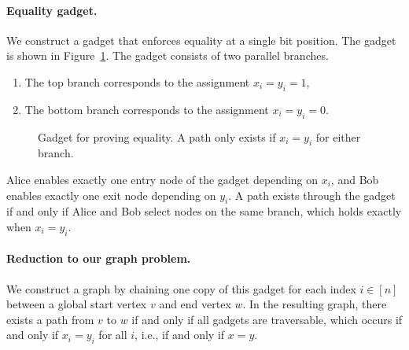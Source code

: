 \paragraph{Equality gadget.}
We construct a gadget that enforces equality at a single bit position. The gadget is shown in Figure~\ref{fig:equality_gadget}. The gadget consists of two parallel branches.

\begin{enumerate}
    \item The top branch corresponds to the assignment $x_i = y_i = 1$, 
    \item The bottom branch corresponds to the assignment $x_i = y_i = 0$. 
\end{enumerate}
 

\begin{figure}[h]
\centering
{}
\caption{Gadget for proving equality. A path only exists if $x_i = y_i$ for either branch.}
\label{fig:equality_gadget}
\end{figure}


Alice enables exactly one entry node of the gadget depending on $x_i$, and Bob enables exactly one exit node depending on $y_i$. A path exists through the gadget if and only if Alice and Bob select nodes on the same branch, which holds exactly when $x_i = y_i$.\\

\paragraph{Reduction to our graph problem.}
We construct a graph by chaining one copy of this gadget for each index $i \in [n]$ between a global start vertex $v$ and end vertex $w$. In the resulting graph, there exists a path from $v$ to $w$ if and only if all gadgets are traversable, which occurs if and only if $x_i = y_i$ for all $i$, i.e., if and only if $x = y$.


